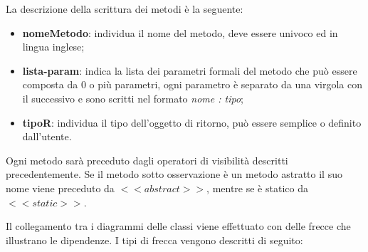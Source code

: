 \begin{enumerate}
\begin{center}
	\end{center}
	La descrizione della scrittura dei metodi è la seguente:
	\begin{itemize}
		\item \textbf{nomeMetodo}: individua il nome del metodo, deve essere univoco ed in lingua inglese;
		\item \textbf{lista-param}: indica la lista dei parametri formali del metodo che può essere composta da 0 o più parametri, ogni parametro è separato da una virgola con il successivo e sono scritti nel formato \textit{nome : tipo};
		\item \textbf{tipoR}: individua il tipo dell'oggetto di ritorno, può essere semplice o definito dall'utente.
	\end{itemize}
	Ogni metodo sarà preceduto dagli operatori di visibilità descritti precedentemente. Se il metodo sotto osservazione è un metodo astratto il suo nome viene preceduto da $<<abstract>>$, mentre se è statico da $<<static>>$.
\end{enumerate}
Il collegamento tra i diagrammi delle classi viene effettuato con delle frecce che illustrano le dipendenze.
I tipi di frecca vengono descritti di seguito:
